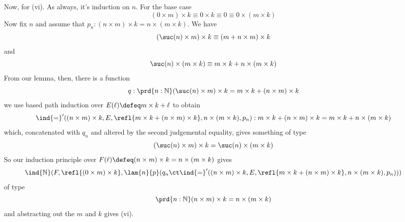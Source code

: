 \begin{enumerate}
Now, for (vi).  As always, it's induction on $n$.  For the base case
\[
(0 \times m) \times k
\equiv 0 \times k
\equiv 0
\equiv 0 \times (m \times k)
\]
Now fix $n$ and assume that $p_{n} : (n \times m) \times k = n \times (m \times
k)$.  We have
\[
(\suc(n) \times m) \times k
\equiv (m + n \times m) \times k
\]
and
\[
\suc(n) \times (m \times k)
\equiv
m \times k + n \times (m \times k)
\]
From our lemma, then, there is a function
\[
q : \prd{n:\mathbb{N}} (\suc(n) \times m) \times k = m \times k + (n \times
m) \times k
\]
we use based path induction over $E(\ell) \defeq m \times k + \ell$ to obtain
\[
\ind{=}'((n\times m)\times k, E, \refl{m\times k + (n \times m) \times k}, n
\times (m \times k), p_{n})
:
m \times k + (n \times m) \times k = m \times k + n \times (m \times k)
\]
which, concatenated with $q_{n}$ and altered by the second judgemental
equality, gives something of type
\[
(\suc(n) \times m) \times k = \suc(n) \times (m \times k)
\]
So our induction principle over $F(\ell) \defeq (n \times m) \times k = n
\times (m \times k)$ gives
\[
\ind{\mathbb{N}}(F,\refl{(0 \times m) \times k},
\lam{n}{p}(
q_{n} \ct \ind{=}'((n\times m)\times k, E, \refl{m\times k + (n \times m) \times k}, n
\times (m \times k), p_{n}) )
)
\]
of type
\[
\prd{n:\mathbb{N}} (n \times m) \times k = n \times (m \times k)
\]
and abstracting out the $m$ and $k$ gives (vi).


\end{enumerate}
